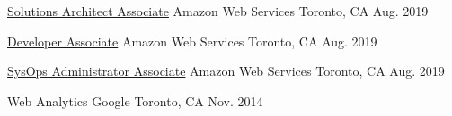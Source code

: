 \begin{cvhonors}

	\cvhonor
	{\href{https://www.certmetrics.com/amazon/public/badge.aspx?i=1&t=c&d=2019-08-20&ci=AWS01002902}{Solutions Architect Associate}} %
	{Amazon Web Services} %
	{Toronto, CA} %
	{Aug. 2019} %

	\cvhonor
	{\href{https://www.certmetrics.com/amazon/public/badge.aspx?i=2&t=c&d=2019-08-20&ci=AWS01002902}{Developer Associate}} %
	{Amazon Web Services} %
	{Toronto, CA} %
	{Aug. 2019} %

	\cvhonor
	{\href{https://www.certmetrics.com/amazon/public/badge.aspx?i=3&t=c&d=2019-08-22&ci=AWS01002902}{SysOps Administrator Associate}} %
	{Amazon Web Services} %
	{Toronto, CA} %
	{Aug. 2019} %

	\cvhonor
	{Web Analytics} %
	{Google} %
	{Toronto, CA} %
	{Nov. 2014} %

\end{cvhonors}
